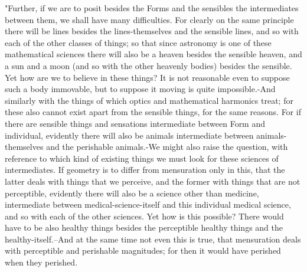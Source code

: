 "Further, if we are to posit besides the Forms and the sensibles the
intermediates between them, we shall have many difficulties. For clearly
on the same principle there will be lines besides the lines-themselves
and the sensible lines, and so with each of the other classes of things;
so that since astronomy is one of these mathematical sciences there
will also be a heaven besides the sensible heaven, and a sun and a
moon (and so with the other heavenly bodies) besides the sensible.
Yet how are we to believe in these things? It is not reasonable even
to suppose such a body immovable, but to suppose it moving is quite
impossible.-And similarly with the things of which optics and mathematical
harmonics treat; for these also cannot exist apart from the sensible
things, for the same reasons. For if there are sensible things and
sensations intermediate between Form and individual, evidently there
will also be animals intermediate between animals-themselves and the
perishable animals.-We might also raise the question, with reference
to which kind of existing things we must look for these sciences of
intermediates. If geometry is to differ from mensuration only in this,
that the latter deals with things that we perceive, and the former
with things that are not perceptible, evidently there will also be
a science other than medicine, intermediate between medical-science-itself
and this individual medical science, and so with each of the other
sciences. Yet how is this possible? There would have to be also healthy
things besides the perceptible healthy things and the healthy-itself.--And
at the same time not even this is true, that mensuration deals with
perceptible and perishable magnitudes; for then it would have perished
when they perished. 

